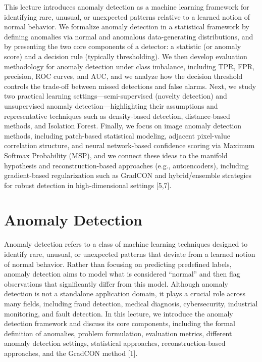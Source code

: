 \documentclass{article}
\renewcommand{\cite}[1]{[#1]}
\begin{document}
This lecture introduces anomaly detection as a machine learning framework for identifying rare, unusual, or unexpected patterns relative to a learned notion of normal behavior. We formalize anomaly detection in a statistical framework by defining anomalies via normal and anomalous data-generating distributions, and by presenting the two core components of a detector: a statistic (or anomaly score) and a decision rule (typically thresholding). We then develop evaluation methodology for anomaly detection under class imbalance, including TPR, FPR, precision, ROC curves, and AUC, and we analyze how the decision threshold controls the trade-off between missed detections and false alarms. Next, we study two practical learning settings---semi-supervised (novelty detection) and unsupervised anomaly detection---highlighting their assumptions and representative techniques such as density-based detection, distance-based methods, and Isolation Forest. Finally, we focus on image anomaly detection methods, including patch-based statistical modeling, adjacent pixel-value correlation structure, and neural network-based confidence scoring via Maximum Softmax Probability (MSP), and we connect these ideas to the manifold hypothesis and reconstruction-based approaches (e.g., autoencoders), including gradient-based regularization such as GradCON and hybrid/ensemble strategies for robust detection in high-dimensional settings \cite{5,7}.

\section{Anomaly Detection}

Anomaly detection refers to a class of machine learning techniques designed to identify rare, unusual, or unexpected patterns that deviate from a learned notion of normal behavior. Rather than focusing on predicting predefined labels, anomaly detection aims to model what is considered “normal” and then flag observations that significantly differ from this model. Although anomaly detection is not a standalone application domain, it plays a crucial role across many fields, including fraud detection, medical diagnosis, cybersecurity, industrial monitoring, and fault detection. In this lecture, we introduce the anomaly detection framework and discuss its core components, including the formal definition of anomalies, problem formulation, evaluation metrics, different anomaly detection settings, statistical approaches, reconstruction-based approaches, and the GradCON method \cite{1}. 
\end{document}
